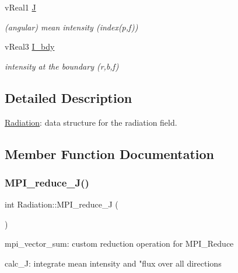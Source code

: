 \begin{DoxyCompactItemize}
\mbox{\label{structRadiation_affdd4d2724f5d0b74c51ed6577b138b3}} 
v\+Real1 \mbox{\hyperlink{structRadiation_affdd4d2724f5d0b74c51ed6577b138b3}{J}}
\begin{DoxyCompactList}\small\item\em (angular) mean intensity (index(p,f)) \end{DoxyCompactList}\item 
\mbox{\label{structRadiation_a15149e3b370f8c7efff1784acfaa4e59}} 
v\+Real3 \mbox{\hyperlink{structRadiation_a15149e3b370f8c7efff1784acfaa4e59}{I\+\_\+bdy}}
\begin{DoxyCompactList}\small\item\em intensity at the boundary (r,b,f) \end{DoxyCompactList}\end{DoxyCompactItemize}


\subsection{Detailed Description}
\mbox{\hyperlink{structRadiation}{Radiation}}\+: data structure for the radiation field. 

\subsection{Member Function Documentation}
\mbox{\label{structRadiation_a70b08565e0721c6b190cd161c6214368}} 
\subsubsection{\texorpdfstring{M\+P\+I\+\_\+reduce\+\_\+\+J()}{MPI\_reduce\_J()}}
{\footnotesize\ttfamily int Radiation\+::\+M\+P\+I\+\_\+reduce\+\_\+J (\begin{DoxyParamCaption}{ }\end{DoxyParamCaption})}



mpi\+\_\+vector\+\_\+sum\+: custom reduction operation for M\+P\+I\+\_\+\+Reduce 

calc\+\_\+J\+: integrate mean intensity and "flux over all directions \mbox{\label{structRadiation_ae1c20ca666229715888324bdfc7e7b32}} 
